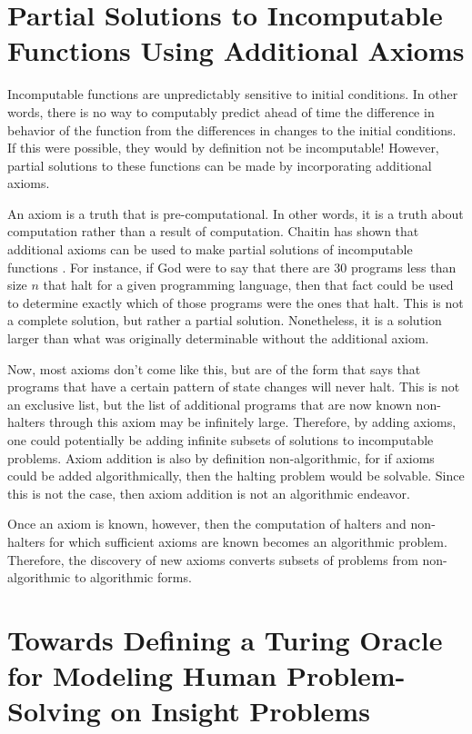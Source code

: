 \section[Partial Solutions to Incomputable Functions]{Partial Solutions to Incomputable Functions Using Additional Axioms}

Incomputable functions are unpredictably sensitive to initial conditions.  In other words, there is no way to computably predict ahead of time the difference in behavior of the function from the differences in changes to the initial conditions.  If this were possible, they would by definition not be incomputable!  However, partial solutions to these functions can be made by incorporating additional axioms.

An axiom is a truth that is pre-computational.  In other words, it is a truth about computation rather than a result of computation.  Chaitin has shown that additional axioms can be used to make partial solutions of incomputable functions \citep{chaitin1982}.  For instance, if God were to say that there are 30 programs less than size $n$ that halt for a given programming language, then that fact could be used to determine exactly which of those programs were the ones that halt.  This is not a complete solution, but rather a partial solution.  Nonetheless, it is a solution larger than what was originally determinable without the additional axiom.

Now, most axioms don't come like this, but are of the form that says that programs that have a certain pattern of state changes will never halt.  This is not an exclusive list, but the list of additional programs that are now known non-halters through this axiom may be infinitely large.  Therefore, by adding axioms, one could potentially be adding infinite subsets of solutions to incomputable problems.  Axiom addition is also by definition non-algorithmic, for if axioms could be added algorithmically, then the halting problem would be solvable.  Since this is not the case, then axiom addition is not an algorithmic endeavor.

Once an axiom is known, however, then the computation of halters and non-halters for which sufficient axioms are known becomes an algorithmic problem.  Therefore, the discovery of new axioms converts subsets of problems from non-algorithmic to algorithmic forms.

\section[Towards Defining a Turing Oracle]{Towards Defining a Turing Oracle for Modeling Human Problem-Solving on Insight Problems}

